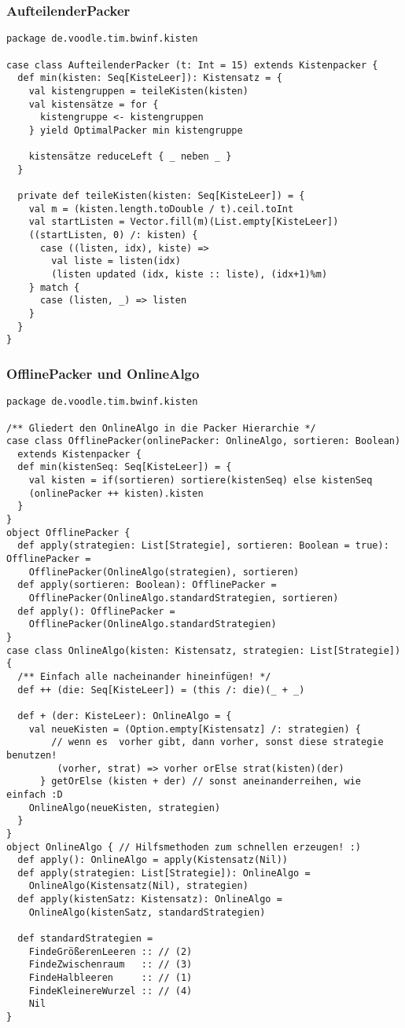 \subsubsection{AufteilenderPacker}
\begin{lstlisting}
package de.voodle.tim.bwinf.kisten

case class AufteilenderPacker (t: Int = 15) extends Kistenpacker {
  def min(kisten: Seq[KisteLeer]): Kistensatz = {
    val kistengruppen = teileKisten(kisten)
    val kistensätze = for {
      kistengruppe <- kistengruppen
    } yield OptimalPacker min kistengruppe
    
    kistensätze reduceLeft { _ neben _ }
  }

  private def teileKisten(kisten: Seq[KisteLeer]) = {
    val m = (kisten.length.toDouble / t).ceil.toInt
    val startListen = Vector.fill(m)(List.empty[KisteLeer])
    ((startListen, 0) /: kisten) {
      case ((listen, idx), kiste) =>
        val liste = listen(idx)
        (listen updated (idx, kiste :: liste), (idx+1)%m)
    } match {
      case (listen, _) => listen
    }
  }
}
\end{lstlisting}
\subsubsection{OfflinePacker und OnlineAlgo}
\begin{lstlisting}
package de.voodle.tim.bwinf.kisten

/** Gliedert den OnlineAlgo in die Packer Hierarchie */
case class OfflinePacker(onlinePacker: OnlineAlgo, sortieren: Boolean)
  extends Kistenpacker {
  def min(kistenSeq: Seq[KisteLeer]) = {
    val kisten = if(sortieren) sortiere(kistenSeq) else kistenSeq
    (onlinePacker ++ kisten).kisten
  }
}
object OfflinePacker {
  def apply(strategien: List[Strategie], sortieren: Boolean = true): OfflinePacker =
    OfflinePacker(OnlineAlgo(strategien), sortieren)
  def apply(sortieren: Boolean): OfflinePacker =
    OfflinePacker(OnlineAlgo.standardStrategien, sortieren)
  def apply(): OfflinePacker =
    OfflinePacker(OnlineAlgo.standardStrategien)
}
case class OnlineAlgo(kisten: Kistensatz, strategien: List[Strategie]) {
  /** Einfach alle nacheinander hineinfügen! */
  def ++ (die: Seq[KisteLeer]) = (this /: die)(_ + _)

  def + (der: KisteLeer): OnlineAlgo = {
    val neueKisten = (Option.empty[Kistensatz] /: strategien) {
        // wenn es  vorher gibt, dann vorher, sonst diese strategie benutzen!
         (vorher, strat) => vorher orElse strat(kisten)(der)
      } getOrElse (kisten + der) // sonst aneinanderreihen, wie einfach :D
    OnlineAlgo(neueKisten, strategien)
  }
}
object OnlineAlgo { // Hilfsmethoden zum schnellen erzeugen! :)
  def apply(): OnlineAlgo = apply(Kistensatz(Nil))
  def apply(strategien: List[Strategie]): OnlineAlgo =
    OnlineAlgo(Kistensatz(Nil), strategien)
  def apply(kistenSatz: Kistensatz): OnlineAlgo =
    OnlineAlgo(kistenSatz, standardStrategien)

  def standardStrategien =
    FindeGrößerenLeeren :: // (2)
    FindeZwischenraum   :: // (3)
    FindeHalbleeren     :: // (1)
    FindeKleinereWurzel :: // (4)
    Nil
}
\end{lstlisting}

